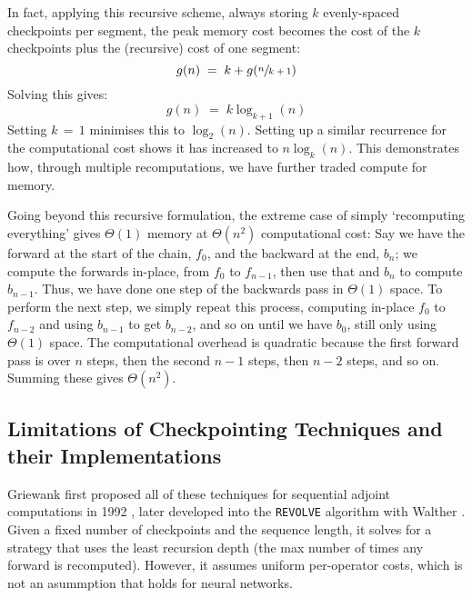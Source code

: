 In fact, applying this recursive scheme, always storing \(k\) evenly-spaced checkpoints per segment, the peak memory cost becomes the cost of the \(k\) checkpoints plus the (recursive) cost of one segment:
\begin{equation*}
    g(n) \;=\; k + g(\sfrac{n}{k+1})
\end{equation*}
Solving this gives:
\begin{equation*}
    g(n) \;=\; k\log_{k+1}(n)
\end{equation*}
Setting \(k\,=\,1\) minimises this to \(\log_2(n)\). 
Setting up a similar recurrence for the computational cost shows it has increased to \(n\log_k(n)\).
This demonstrates how, through multiple recomputations, we have further traded compute for memory.

Going beyond this recursive formulation, the extreme case of simply `recomputing everything' gives \(\Theta(\mathrm{1})\) memory at \(\Theta(n^2)\) computational cost:
Say we have the forward at the start of the chain, \(f_0\), and the backward at the end, \(b_n\);
we compute the forwards in-place, from \(f_0\) to \(f_{n-1}\), then use that and \(b_n\) to compute \(b_{n-1}\).
Thus, we have done one step of the backwards pass in \(\Theta(\mathrm{1})\) space.
To perform the next step, we simply repeat this process, computing in-place \(f_0\) to \(f_{n-2}\) and using \(b_{n-1}\) to get \(b_{n-2}\), and so on until we have \(b_0\), still only using \(\Theta(\mathrm{1})\) space. The computational overhead is quadratic because the first forward pass is over \(n\) steps, then the second \(n-1\) steps, then \(n-2\) steps, and so on. Summing these gives \(\Theta(n^2)\).

\subsection{Limitations of Checkpointing Techniques and their Implementations}
Griewank first proposed all of these techniques for sequential adjoint computations in 1992 \cite{Griewank1992}, later developed into the \texttt{REVOLVE} algorithm with Walther \cite{Revolve2000}.
Given a fixed number of checkpoints and the sequence length, it solves for a strategy that uses the least recursion depth (the max number of times any forward is recomputed).
However, it assumes uniform per-operator costs, which is not an asummption that holds for neural networks.


